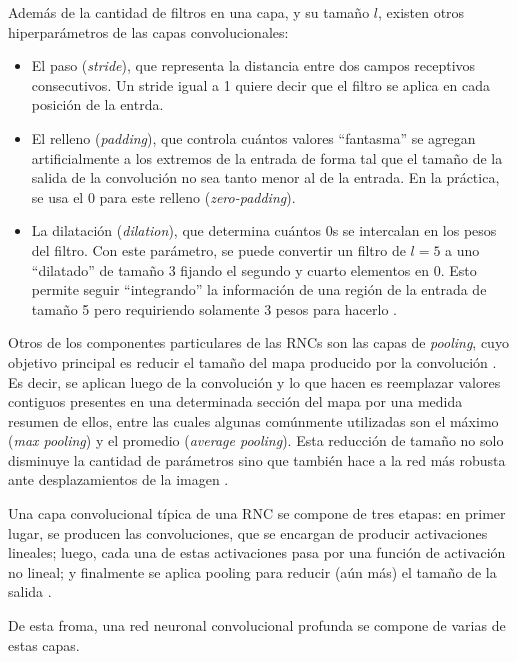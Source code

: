 \documentclass[../../main.tex]{subfiles}
\begin{document}
Además de la cantidad de filtros en una capa, y su tamaño \(l\), existen otros
hiperparámetros de las capas convolucionales: \vspace{-0.25cm}
\begin{itemize}[noitemsep]
    \item El paso (\textit{stride}), que representa la distancia entre dos campos receptivos
    consecutivos. Un stride igual a 1 quiere decir que el filtro se aplica en cada
    posición de la entrda.
    \item El relleno (\textit{padding}), que controla cuántos valores ``fantasma'' se agregan
    artificialmente a los extremos de la entrada de forma tal que el tamaño de la salida
    de la convolución no sea tanto menor al de la entrada. En la práctica, se usa el 0
    para este relleno (\textit{zero-padding}).
    \item La dilatación (\textit{dilation}), que determina cuántos 0s se intercalan
    en los pesos del filtro. Con este parámetro, se puede convertir un filtro de \(l=5\)
    a uno ``dilatado'' de tamaño 3 fijando el segundo y cuarto elementos en 0. Esto
    permite seguir ``integrando'' la información de una región de la entrada de tamaño
    5 pero requiriendo solamente 3 pesos para hacerlo \cite{prince2024understanding}.
\end{itemize}

Otros de los componentes particulares de las RNCs son las capas de \textit{pooling}, cuyo
objetivo principal es reducir el tamaño del mapa producido por la convolución
\cite{hands-on-ML-sklearn-tf}. Es decir, se aplican luego de la convolución y lo que hacen
es reemplazar valores contiguos presentes en una determinada sección del mapa por una medida
resumen de ellos, entre las cuales algunas comúnmente utilizadas son el máximo
(\textit{max pooling}) y el promedio (\textit{average pooling}). Esta reducción de tamaño
no solo disminuye la cantidad de parámetros sino que también hace a la red más robusta
ante desplazamientos de la imagen \cite{hands-on-ML-sklearn-tf}.

Una capa convolucional típica de una RNC se compone de tres etapas: en primer lugar, se
producen las convoluciones, que se encargan de producir activaciones lineales; luego, cada
una de estas activaciones pasa por una función de activación no lineal; y finalmente se
aplica pooling para reducir (aún más) el tamaño de la salida \cite{deep-learning}.

De esta froma, una red neuronal convolucional profunda se compone de varias de estas
capas.
\end{document}
